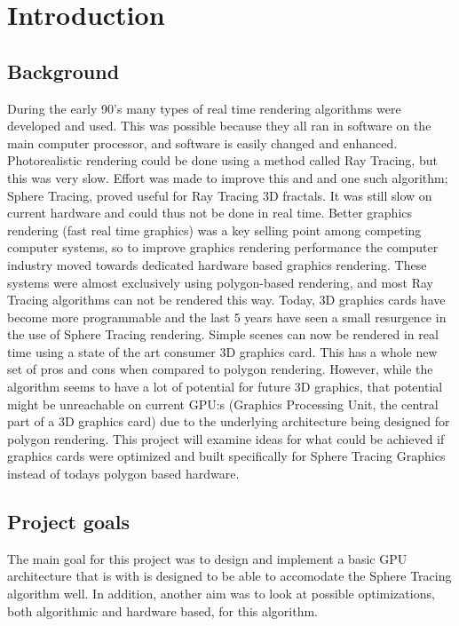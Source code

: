 \chapter{Introduction} 
	
	\section{Background}
		During the early 90’s many types of real time rendering algorithms were 
		developed and used. This was possible because they all ran in software 
		on the main computer processor, and software is easily changed and 
		enhanced. Photorealistic rendering could be done using a method called 
		Ray Tracing, but this was very slow. Effort was made to improve this and 
		and one such algorithm; Sphere Tracing,  proved useful for Ray Tracing 
		3D fractals. It was still slow on current hardware and could 
		thus not be done in real time. Better graphics rendering
		(fast real time graphics) was a key selling point among competing 
		computer systems, so to improve graphics rendering performance the 
		computer industry moved towards dedicated hardware based graphics 
		rendering. These systems were almost exclusively using polygon-based 
		rendering, and most Ray Tracing algorithms can not be rendered this 
		way. Today, 3D graphics cards have become more programmable and the 
		last 5 years have seen a small resurgence in the use of Sphere Tracing
		rendering. Simple scenes can now be rendered in real time using a state 
		of the art consumer 3D graphics card. This has a whole new set of pros 
		and cons when compared to polygon rendering. However, while 
		the algorithm seems to have a lot of potential for future 3D graphics, 
		that potential might be unreachable on current GPU:s 
		(Graphics Processing Unit, the central part of a 3D graphics card) due 
		to the underlying architecture being designed for polygon rendering. 
		This project will examine ideas for what could be achieved if graphics 
		cards were optimized and built specifically for Sphere Tracing Graphics
		instead of todays polygon based hardware.
		 
	
	\section{Project goals}
		
		The main goal for this project was to design and implement a basic GPU 
		architecture that is with is designed to be able to accomodate the Sphere 
		Tracing algorithm well. In addition, another aim was to look at possible 
		optimizations, both algorithmic	and hardware based, for this algorithm.
		
